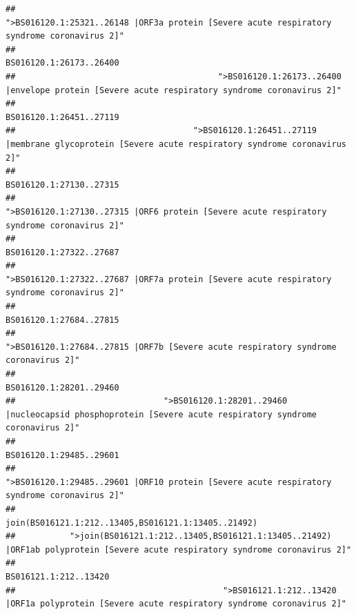\documentclass[
]{article}
\begin{document}
\begin{verbatim}
##                                            ">BS016120.1:25321..26148 |ORF3a protein [Severe acute respiratory syndrome coronavirus 2]" 
##                                                                                                                BS016120.1:26173..26400 
##                                         ">BS016120.1:26173..26400 |envelope protein [Severe acute respiratory syndrome coronavirus 2]" 
##                                                                                                                BS016120.1:26451..27119 
##                                    ">BS016120.1:26451..27119 |membrane glycoprotein [Severe acute respiratory syndrome coronavirus 2]" 
##                                                                                                                BS016120.1:27130..27315 
##                                             ">BS016120.1:27130..27315 |ORF6 protein [Severe acute respiratory syndrome coronavirus 2]" 
##                                                                                                                BS016120.1:27322..27687 
##                                            ">BS016120.1:27322..27687 |ORF7a protein [Severe acute respiratory syndrome coronavirus 2]" 
##                                                                                                                BS016120.1:27684..27815 
##                                                    ">BS016120.1:27684..27815 |ORF7b [Severe acute respiratory syndrome coronavirus 2]" 
##                                                                                                                BS016120.1:28201..29460 
##                              ">BS016120.1:28201..29460 |nucleocapsid phosphoprotein [Severe acute respiratory syndrome coronavirus 2]" 
##                                                                                                                BS016120.1:29485..29601 
##                                            ">BS016120.1:29485..29601 |ORF10 protein [Severe acute respiratory syndrome coronavirus 2]" 
##                                                                                    join(BS016121.1:212..13405,BS016121.1:13405..21492) 
##           ">join(BS016121.1:212..13405,BS016121.1:13405..21492) |ORF1ab polyprotein [Severe acute respiratory syndrome coronavirus 2]" 
##                                                                                                                  BS016121.1:212..13420 
##                                          ">BS016121.1:212..13420 |ORF1a polyprotein [Severe acute respiratory syndrome coronavirus 2]" 

\end{verbatim}
\end{document}
